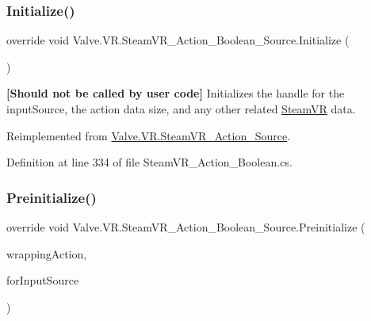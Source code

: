 \subsubsection{\texorpdfstring{Initialize()}{Initialize()}}
{\footnotesize\ttfamily override void Valve.\+V\+R.\+Steam\+V\+R\+\_\+\+Action\+\_\+\+Boolean\+\_\+\+Source.\+Initialize (\begin{DoxyParamCaption}{ }\end{DoxyParamCaption})\hspace{0.3cm}{\ttfamily [virtual]}}



{\bfseries{\mbox{[}Should not be called by user code\mbox{]}}} Initializes the handle for the input\+Source, the action data size, and any other related \mbox{\hyperlink{class_valve_1_1_v_r_1_1_steam_v_r}{Steam\+VR}} data. 



Reimplemented from \mbox{\hyperlink{class_valve_1_1_v_r_1_1_steam_v_r___action___source_aa4784c092cc0a4372812834bfcceab6d}{Valve.\+V\+R.\+Steam\+V\+R\+\_\+\+Action\+\_\+\+Source}}.



Definition at line 334 of file Steam\+V\+R\+\_\+\+Action\+\_\+\+Boolean.\+cs.

\mbox{\label{class_valve_1_1_v_r_1_1_steam_v_r___action___boolean___source_a35bf3460bf62e92bc67e371b16125c39}} 
\subsubsection{\texorpdfstring{Preinitialize()}{Preinitialize()}}
{\footnotesize\ttfamily override void Valve.\+V\+R.\+Steam\+V\+R\+\_\+\+Action\+\_\+\+Boolean\+\_\+\+Source.\+Preinitialize (\begin{DoxyParamCaption}\item[{\mbox{\hyperlink{class_valve_1_1_v_r_1_1_steam_v_r___action}{Steam\+V\+R\+\_\+\+Action}}}]{wrapping\+Action,  }\item[{\mbox{\hyperlink{namespace_valve_1_1_v_r_a82e5bf501cc3aa155444ee3f0662853f}{Steam\+V\+R\+\_\+\+Input\+\_\+\+Sources}}}]{for\+Input\+Source }\end{DoxyParamCaption})\hspace{0.3cm}{\ttfamily [virtual]}}



